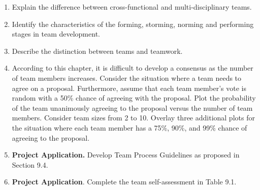 \begin{enumerate}
\def\labelenumi{\arabic{enumi}.}
\item
  Explain the difference between cross-functional and multi-disciplinary
  teams.
\item
  Identify the characteristics of the forming, storming, norming and
  performing stages in team development.
\item
  Describe the distinction between teams and teamwork.
\item
  According to this chapter, it is difficult to develop a consensus as
  the number of team members increases. Consider the situation where a
  team needs to agree on a proposal. Furthermore, assume that each team
  member's vote is random with a 50\% chance of agreeing with the
  proposal. Plot the probability of the team unanimously agreeing to the
  proposal versus the number of team members. Consider team sizes from 2
  to 10. Overlay three additional plots for the situation where each
  team member has a 75\%, 90\%, and 99\% chance of agreeing to the
  proposal.
\item
  \textbf{Project Application.} Develop Team Process Guidelines as
  proposed in Section 9.4.
\item
  \textbf{Project Application}. Complete the team self-assessment in
  Table 9.1.
\end{enumerate}
